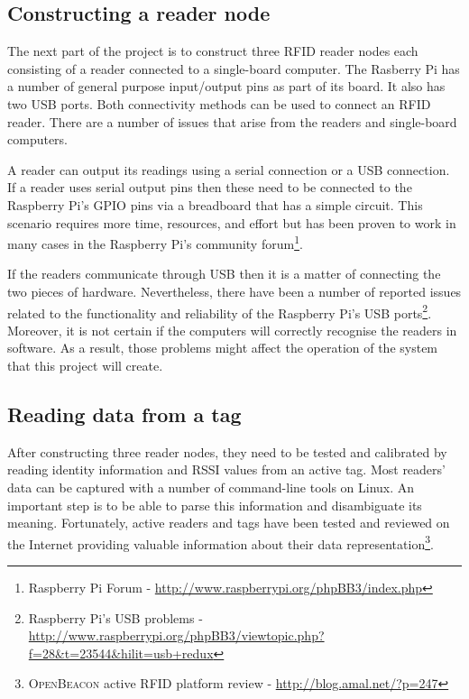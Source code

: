 \subsection{Constructing a reader node}

The next part of the project is to construct three RFID reader nodes each consisting of a reader connected to a single-board computer. The Rasberry Pi has a number of general purpose input/output pins as part of its board. It also has two USB ports. Both connectivity methods can be used to connect an RFID reader. There are a number of issues that arise from the readers and single-board computers.

A reader can output its readings using a serial connection or a USB connection. If a reader uses serial output pins then these need to be connected to the Raspberry Pi's GPIO pins via a breadboard that has a simple circuit. This scenario requires more time, resources, and effort but has been proven to work in many cases in the Raspberry Pi's community forum\footnote{Raspberry Pi Forum - \url{http://www.raspberrypi.org/phpBB3/index.php}}.

If the readers communicate through USB then it is a matter of connecting the two pieces of hardware. Nevertheless, there have been a number of reported issues related to the functionality and reliability of the Raspberry Pi's USB ports\footnote{Raspberry Pi's USB problems - \url{http://www.raspberrypi.org/phpBB3/viewtopic.php?f=28&t=23544&hilit=usb+redux}}. Moreover, it is not certain if the computers will correctly recognise the readers in software. As a result, those problems might affect the operation of the system that this project will create.

\subsection{Reading data from a tag}

After constructing three reader nodes, they need to be tested and calibrated by reading identity information and RSSI values from an active tag. Most readers' data can be captured with a number of command-line tools on Linux. An important step is to be able to parse this information and disambiguate its meaning. Fortunately, active readers and tags have been tested and reviewed on the Internet providing valuable information about their data representation\footnote{\textsc{OpenBeacon} active RFID platform review - \url{http://blog.amal.net/?p=247}}.

